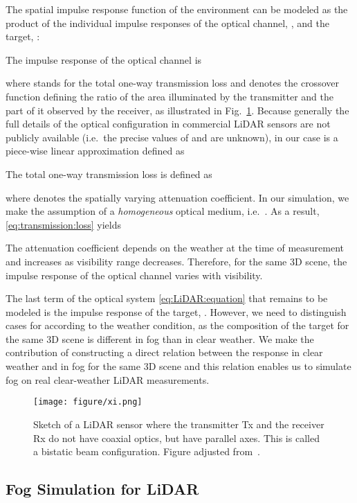 \documentclass[10pt,twocolumn,letterpaper]{article}
\begin{document}
The spatial impulse response function  of the environment can be modeled as the product of the individual impulse responses of the optical channel, , and the target, :

The impulse response of the optical channel  is

where  stands for the total one-way transmission loss and  denotes the crossover function defining the ratio of the area illuminated by the transmitter and the part of it observed by the receiver, as illustrated in Fig.~\ref{fig:xi}. Because generally the full details of the optical configuration in commercial LiDAR sensors are not publicly available (i.e.\ the precise values of  and  are unknown),  in our case is a piece-wise linear approximation defined as

The total one-way transmission loss  is defined as 

where  denotes the spatially varying attenuation coefficient. In our simulation, we make the assumption of a \emph{homogeneous} optical medium, i.e.\ . As a result, \eqref{eq:transmission:loss} yields 

The attenuation coefficient  depends on the weather at the time of measurement and increases as visibility range decreases. Therefore, for the same 3D scene, the impulse response of the optical channel  varies with visibility.

The last term of the optical system \eqref{eq:LiDAR:equation} that remains to be modeled is the impulse response of the target, . However, we need to distinguish cases for  according to the weather condition, as the composition of the target for the same 3D scene is different in fog than in clear weather. We make the contribution of constructing a direct relation between the response  in clear weather and in fog for the same 3D scene and this relation enables us to simulate fog on real clear-weather LiDAR measurements.


\begin{figure}
     \centering
     \texttt{[image: figure/xi.png]}
     \caption{Sketch of a LiDAR sensor where the transmitter \textsf{Tx} and the receiver \textsf{Rx} do not have coaxial optics, but have parallel axes. This is called a bistatic beam configuration. Figure adjusted from~\cite{Rasshofer_2011}.}
     \label{fig:xi}
\end{figure}

\subsection{Fog Simulation for LiDAR}
\label{sec:derivation:simulation}
\end{document}
